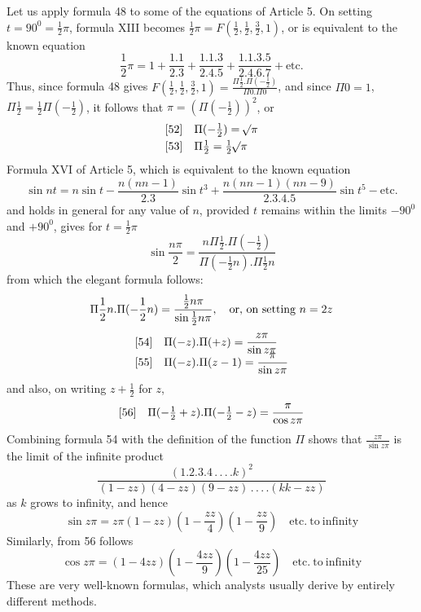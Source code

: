 Let us apply formula 48 to some of the equations of Article 5. On setting $t=90^0=\frac12\pi$, formula XIII becomes $\frac12\pi=F(\frac12,\frac12,\frac32,1)$, or is equivalent to the known equation
\[
\frac12\pi=1+\frac{1.1}{2.3}+\frac{1.1.3}{2.4.5}
+\frac{1.1.3.5}{2.4.6.7}+\mathrm{etc.}
\]
Thus, since formula 48 gives $F(\frac12,\frac12,\frac32,1)=\frac{\Pi\frac12.\Pi(-\frac12)}{\Pi0.\Pi0}$, and since $\Pi0=1$, $\Pi\frac12=\frac12\Pi(-\frac12)$, it follows that $\pi=(\Pi(-\frac12))^2$, or
\[
\begin{array}{@{}ll@{}}
[52]&\displaystyle\Pi(-\tfrac12)=\BareRoot{\pi}\\[3pt]
[53]&\displaystyle\Pi\tfrac12=\tfrac12\BareRoot{\pi}
\end{array}
\]
Formula XVI of Article 5, which is equivalent to the known equation
\[
\sin nt=n\sin t-\frac{n(nn-1)}{2.3}\sin t^3
+\frac{n(nn-1)(nn-9)}{2.3.4.5}\sin t^5-\mathrm{etc.}
\]
and holds in general for any value of $n$, provided $t$ remains within the limits $-90^0$ and $+90^0$, gives for $t=\frac12\pi$
\[
\sin\frac{n\pi}{2}=
\frac{n\Pi\frac12.\Pi(-\frac12)}{\Pi(-\frac12n).\Pi\frac12n}
\]
from which the elegant formula follows:
\[
\Pi\frac12n.\Pi(-\frac12n)=\frac{\frac12n\pi}{\sin\frac12n\pi},
\quad\hbox{or, on setting }n=2z
\]
\[
\begin{array}{@{}ll@{}}
[54]&\displaystyle\Pi(-z).\Pi(+z)=\frac{z\pi}{\sin z\pi}\\[3pt]
[55]&\displaystyle\Pi(-z).\Pi(z-1)=\frac{\pi}{\sin z\pi}
\end{array}
\]
and also, on writing $z+\frac12$ for $z$,
\[
\begin{array}{@{}ll@{}}
[56]&\displaystyle\Pi(-\tfrac12+z).\Pi(-\tfrac12-z)=\frac{\pi}{\cos z\pi}
\end{array}
\]
Combining formula 54 with the definition of the function $\Pi$ shows that $\frac{z\pi}{\sin z\pi}$ is the limit of the infinite product
\[
\frac{(1.2.3.4\,.\,.\,.\,.k)^2}
{(1-zz)(4-zz)(9-zz)\,.\,.\,.\,.(kk-zz)}
\]
as $k$ grows to infinity, and hence
\[
\sin z\pi=z\pi(1-zz)(1-\frac{zz}{4})(1-\frac{zz}{9})\quad
\mathrm{etc.\ to\ infinity}
\]
Similarly, from 56 follows
\[
\cos z\pi=(1-4zz)(1-\frac{4zz}{9})(1-\frac{4zz}{25})\quad
\mathrm{etc.\ to\ infinity}
\]
These are very well-known formulas, which analysts usually derive by entirely different methods.

